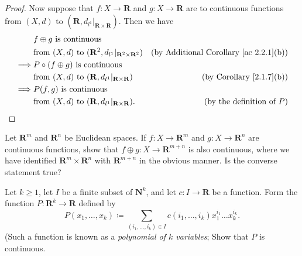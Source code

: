 \begin{proof}
    Now suppose that \(f : X \to \mathbf{R}\) and \(g : X \to \mathbf{R}\) are to continuous functions from \((X, d)\) to \((\mathbf{R}, d_{l^1}|_{\mathbf{R} \times \mathbf{R}})\).
    Then we have
    \begin{align*}
                 & f \oplus g \text{ is continuous }                                                                                                                \\
                 & \text{from } (X, d) \text{ to } (\mathbf{R}^2, d_{l^1}|_{\mathbf{R}^2 \times \mathbf{R}^2}) & \text{(by Additional Corollary \ref{ac 2.2.1}(b))} \\
        \implies & P \circ (f \oplus g) \text{ is continuous }                                                                                                      \\
                 & \text{from } (X, d) \text{ to } (\mathbf{R}, d_{l^1}|_{\mathbf{R} \times \mathbf{R}})       & \text{(by Corollary \ref{2.1.7}(b))}               \\
        \implies & P(f, g) \text{ is continuous }                                                                                                                   \\
                 & \text{from } (X, d) \text{ to } (\mathbf{R}, d_{l^1}|_{\mathbf{R} \times \mathbf{R}}).      & \text{(by the definition of \(P\))}
    \end{align*}
\end{proof}

\begin{exercise}\label{ex 2.2.6}
    Let \(\mathbf{R}^m\) and \(\mathbf{R}^n\) be Euclidean spaces.
    If \(f : X \to \mathbf{R}^m\) and \(g : X \to \mathbf{R}^n\) are continuous functions, show that \(f \oplus g : X \to \mathbf{R}^{m + n}\) is also continuous, where we have identified \(\mathbf{R}^m \times \mathbf{R}^n\) with \(\mathbf{R}^{m + n}\) in the obvious manner.
    Is the converse statement true?
\end{exercise}

\begin{exercise}\label{ex 2.2.7}
    Let \(k \geq 1\), let \(I\) be a finite subset of \(\mathbf{N}^k\), and let \(c : I \to \mathbf{R}\) be a function.
    Form the function \(P : \mathbf{R}^k \to \mathbf{R}\) defined by
    \[
        P(x_1, \dots, x_k) \coloneqq \sum_{(i_1, \dots, i_k) \in I} c(i_1, \dots, i_k) x_1^{i_1} \dots x_k^{i_k}.
    \]
    (Such a function is known as a \emph{polynomial of \(k\) variables};
    Show that \(P\) is continuous.
\end{exercise}

